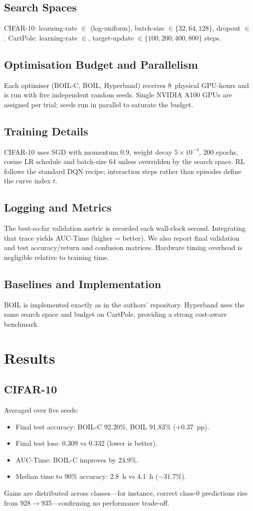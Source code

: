 \documentclass{article} %
\begin{document}
\subsection{Search Spaces}
CIFAR-10: learning-rate \(\in\) (log-uniform), batch-size \(\in\{32,64,128\}\), dropout \(\in\). CartPole: learning-rate \(\in\), target-update \(\in\{100,200,400,800\}\) steps.

\subsection{Optimisation Budget and Parallelism}
Each optimiser (BOIL-C, BOIL, Hyperband) receives 8~physical GPU-hours and is run with five independent random seeds. Single NVIDIA A100 GPUs are assigned per trial; seeds run in parallel to saturate the budget.

\subsection{Training Details}
CIFAR-10 uses SGD with momentum 0.9, weight decay \(5\times 10^{-4}\), 200 epochs, cosine LR schedule and batch-size 64 unless overridden by the search space. RL follows the standard DQN recipe; interaction steps rather than episodes define the curve index \(t\).

\subsection{Logging and Metrics}
The best-so-far validation metric is recorded each wall-clock second. Integrating that trace yields AUC-Time (higher = better). We also report final validation and test accuracy/return and confusion matrices. Hardware timing overhead is negligible relative to training time.

\subsection{Baselines and Implementation}
BOIL is implemented exactly as in the authors' repository. Hyperband uses the same search space and budget on CartPole, providing a strong cost-aware benchmark.

\section{Results}
\label{sec:results}%
%
\subsection{CIFAR-10}
Averaged over five seeds:
\begin{itemize}
  \item Final test accuracy: BOIL-C 92.20\%, BOIL 91.83\% (+0.37~pp).
  \item Final test loss: 0.309 vs 0.332 (lower is better).
  \item AUC-Time: BOIL-C improves by 24.9\%.
  \item Median time to 90\% accuracy: 2.8~h vs 4.1~h (\(-31.7\%\)).
\end{itemize}
Gains are distributed across classes---for instance, correct class-0 predictions rise from 928\(\to\)935---confirming no performance trade-off.
\end{document}
